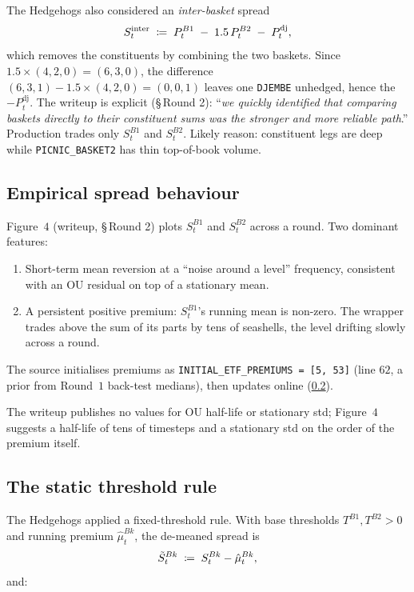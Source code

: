 The Hedgehogs also considered an \emph{inter-basket} spread
\begin{equation}
  S^{\text{inter}}_t
  \;\coloneqq\; P^{B1}_t \;-\; 1.5\,P^{B2}_t \;-\; P^{\text{dj}}_t,
  \label{eq:s_inter}
\end{equation}
which removes the constituents by combining the two baskets.
Since $1.5 \times (4, 2, 0) = (6, 3, 0)$, the difference
$(6, 3, 1) - 1.5 \times (4, 2, 0) = (0, 0, 1)$ leaves one
\texttt{DJEMBE} unhedged, hence the $-P^{\text{dj}}_t$. The
writeup is explicit (\S\,Round 2): ``\emph{we quickly identified
that comparing baskets directly to their constituent sums was the
stronger and more reliable path}.'' Production trades only
$S^{B1}_t$ and $S^{B2}_t$. Likely reason: constituent legs are
deep while \texttt{PICNIC\_BASKET2} has thin top-of-book volume.

\subsection{Empirical spread behaviour}
\label{sec:ch11_hh_empirical}

Figure~$4$ (writeup, \S\,Round 2) plots $S^{B1}_t$ and $S^{B2}_t$
across a round. Two dominant features:

\begin{enumerate}
  \item Short-term mean reversion at a ``noise around a level''
  frequency, consistent with an OU residual on top of a stationary
  mean.
  \item A persistent positive premium: $S^{B1}_t$'s running mean
  is non-zero. The wrapper trades above the sum of its parts by
  tens of seashells, the level drifting slowly across a round.
\end{enumerate}

The source initialises premiums as
\texttt{INITIAL\_ETF\_PREMIUMS = [5, 53]} (line $62$, a prior from
Round~$1$ back-test medians), then updates online
(\cref{sec:ch11_hh_threshold}).

The writeup publishes no values for OU half-life or stationary
std; Figure~$4$ suggests a half-life of tens of timesteps and a
stationary std on the order of the premium itself.

\subsection{The static threshold rule}
\label{sec:ch11_hh_threshold}

The Hedgehogs applied a fixed-threshold rule. With base thresholds
$T^{B1}, T^{B2} > 0$ and running premium $\hat\mu^{Bk}_t$, the
de-meaned spread is
\begin{equation}
  \tilde S^{Bk}_t \;\coloneqq\; S^{Bk}_t - \hat\mu^{Bk}_t,
  \label{eq:demeaned_spread}
\end{equation}
and:

